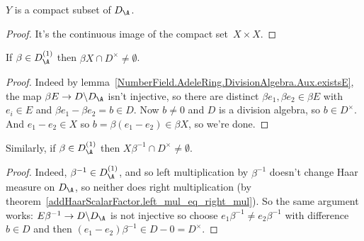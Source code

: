 \begin{lemma}
  \label{NumberField.AdeleRing.DivisionAlgebra.Aux.Y_compact}
  \leanok
  $Y$ is a compact subset of $D_{\A}$.
\end{lemma}
\begin{proof}
  It's the continuous image of the compact set~$X\times X$.
\end{proof}

\begin{lemma}
  \label{NumberField.AdeleRing.DivisionAlgebra.Aux.X_meets_kernel}
  \leanok
  If $\beta\in D_{\A}^{(1)}$ then
$\beta X\cap D^\times\not=\emptyset$.
\end{lemma}
\begin{proof}
Indeed by lemma~\ref{NumberField.AdeleRing.DivisionAlgebra.Aux.existsE},
the map $\beta E\to D\backslash D_{\A}$
isn't injective, so there are distinct
$\beta e_1,\beta e_2\in \beta E$ with $e_i\in E$ and
$\beta e_1-\beta e_2=b\in D$.
Now $b\not=0$ and $D$ is a division algebra, so $b\in D^\times$.
And $e_1-e_2\in X$ so $b=\beta(e_1-e_2)\in \beta X$, so we're done.
\end{proof}

\begin{lemma}
  \label{NumberField.AdeleRing.DivisionAlgebra.Aux.X_meets_kernel'}
  \leanok
  Similarly, if $\beta\in D_{\A}^{(1)}$ then
  $X\beta^{-1}\cap D^\times\not=\emptyset$.
\end{lemma}
\begin{proof}
  Indeed, $\beta^{-1}\in D_{\A}^{(1)}$, and so left multiplication by $\beta^{-1}$
  doesn't change Haar measure on $D_{\A}$, so neither does right multiplication
  (by theorem~\ref{addHaarScalarFactor.left_mul_eq_right_mul}).
  So the same argument works: $E\beta^{-1}\to D\backslash D_{\A}$ is not
  injective so choose $e_1\beta^{-1}\not=e_2\beta^{-1}$ with difference $b\in D$
  and then $(e_1-e_2)\beta^{-1}\in D-{0}=D^\times$.
\end{proof}

